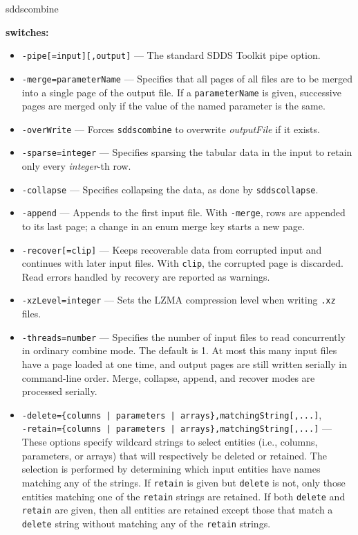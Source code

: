 \begin{sddsprog}{sddscombine}
  \item \textbf{switches:}
    \begin{itemize}
      \item \verb|-pipe[=input][,output]| --- The standard SDDS Toolkit pipe option.
      \item \verb|-merge=parameterName| --- Specifies that all pages of all files are to be merged into a single page of the output file. If a \verb|parameterName| is given, successive pages are merged only if the value of the named parameter is the same.
      \item \verb|-overWrite| --- Forces \verb|sddscombine| to overwrite \emph{outputFile} if it exists.
      \item \verb|-sparse=integer| --- Specifies sparsing the tabular data in the input to retain only every \emph{integer}-th row.
      \item \verb|-collapse| --- Specifies collapsing the data, as done by \verb|sddscollapse|.
      \item \verb|-append| --- Appends to the first input file. With \verb|-merge|, rows are appended to its last page; a change in an enum merge key starts a new page.
      \item \verb|-recover[=clip]| --- Keeps recoverable data from corrupted input and continues with later input files. With \verb|clip|, the corrupted page is discarded. Read errors handled by recovery are reported as warnings.
      \item \verb|-xzLevel=integer| --- Sets the LZMA compression level when writing \verb|.xz| files.
      \item \verb|-threads=number| --- Specifies the number of input files to read concurrently in ordinary combine mode. The default is 1. At most this many input files have a page loaded at one time, and output pages are still written serially in command-line order. Merge, collapse, append, and recover modes are processed serially.
      \item {\tt -delete=\{columns | parameters | arrays\},matchingString[,...]},\\
            {\tt -retain=\{columns | parameters | arrays\},matchingString[,...]} --- These options specify wildcard strings to select entities (i.e., columns, parameters, or arrays) that will respectively be deleted or retained. The selection is performed by determining which input entities have names matching any of the strings. If \verb|retain| is given but \verb|delete| is not, only those entities matching one of the \verb|retain| strings are retained. If both \verb|delete| and \verb|retain| are given, then all entities are retained except those that match a \verb|delete| string without matching any of the \verb|retain| strings.
    \end{itemize}


\end{sddsprog}
